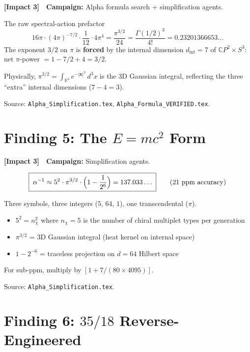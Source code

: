 \documentclass[11pt,a4paper]{article}
\newcommand{\impactthree}{\textcolor{impact3}{\textbf{[Impact 3]}}}
\newcommand{\CP}{\mathbb{C}P}
\begin{document}
\impactthree\ \ \textbf{Campaign:} Alpha formula search + simplification agents.

The raw spectral-action prefactor
\[
16\pi \cdot (4\pi)^{-7/2} \cdot \frac{1}{12} \cdot 4\pi^4
= \frac{\pi^{3/2}}{24}
= \frac{\Gamma(1/2)^3}{4!}
= 0.23201366653\ldots
\]
The exponent $3/2$ on $\pi$ is \textbf{forced} by the internal dimension
$d_{\mathrm{int}} = 7$ of $\CP^2 \times S^3$: net $\pi$-power
$= 1 - 7/2 + 4 = 3/2$.

Physically, $\pi^{3/2} = \int_{\mathbb{R}^3} e^{-|\mathbf{x}|^2}\,d^3x$
is the 3D Gaussian integral, reflecting the three ``extra'' internal
dimensions ($7 - 4 = 3$).

Source: \texttt{Alpha\_Simplification.tex}, \texttt{Alpha\_Formula\_VERIFIED.tex}.


\section{Finding 5: The $E = mc^2$ Form}
\label{sec:emc2}

\impactthree\ \ \textbf{Campaign:} Simplification agents.

\begin{equation}
\boxed{\;
\alpha^{-1} \approx 5^2 \cdot \pi^{3/2} \cdot \Bigl(1 - \frac{1}{2^6}\Bigr)
= 137.033\ldots
\;}
\qquad\text{(21 ppm accuracy)}
\end{equation}

Three symbols, three integers ($5$, $64$, $1$), one transcendental ($\pi$).
\begin{itemize}[nosep]
\item $5^2 = n_\chi^2$ where $n_\chi = 5$ is the number of chiral multiplet
  types per generation
\item $\pi^{3/2}$ = 3D Gaussian integral (heat kernel on internal space)
\item $1 - 2^{-6}$ = traceless projection on $d = 64$ Hilbert space
\end{itemize}
For sub-ppm, multiply by $[1 + 7/(80 \times 4095)]$.

Source: \texttt{Alpha\_Simplification.tex}.


\section{Finding 6: $35/18$ Reverse-Engineered}
\label{sec:3518}
\end{document}
